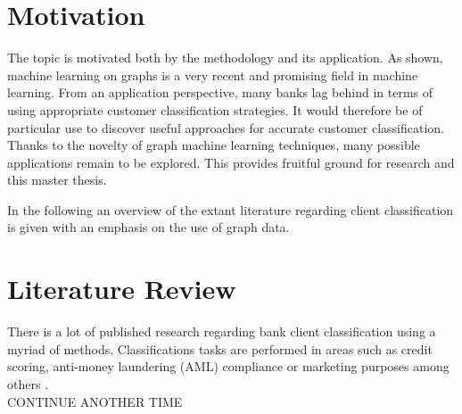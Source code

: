 	\section{Motivation}

	The topic is motivated both by the methodology and its application. As
	shown, machine learning on graphs is a very recent and promising field in
	machine learning. From an application perspective, many banks lag behind in
	terms of using appropriate customer classification strategies. It would
	therefore be of particular use to discover useful approaches for accurate
	customer classification. Thanks to the novelty of graph machine learning
	techniques, many possible applications remain to be explored. This provides
	fruitful ground for research and this master thesis. 

	\noindent In the following an overview of the extant literature regarding 
	client classification is given with an emphasis on the use of graph data. 


	\section{Literature Review}

	There is a lot of published research regarding bank client classification
	using a myriad of methods. Classifications tasks are performed in areas
	such as credit scoring, anti-money laundering (AML) compliance or marketing
	purposes among others
	\citep{sukharev2020ews,weber2018scalable,moro2014data}. \\

	CONTINUE ANOTHER TIME



